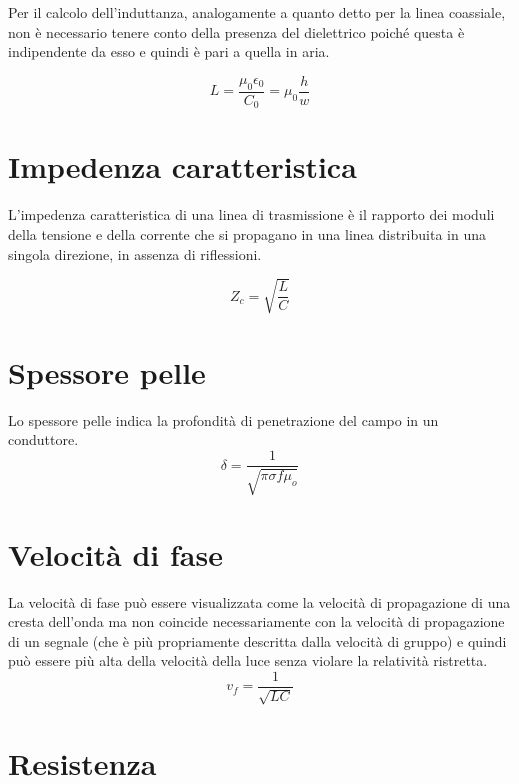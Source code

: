 \documentclass[10pt,a4paper]{report}
\begin{document}
			Per il calcolo dell’induttanza, analogamente a quanto detto per la linea coassiale, non è necessario tenere conto della presenza del dielettrico
			poiché questa è indipendente da esso e quindi è pari a quella in aria.
		
			\begin{equation}
				L=\frac{\mu_0 \epsilon_0}{C_0}=\mu_0 \frac{h}{w}
			\end{equation}
	


	\section{Impedenza caratteristica}

			L'impedenza caratteristica di una linea di trasmissione è il rapporto dei moduli della tensione e della corrente che si propagano in una linea distribuita in una singola direzione, in assenza di riflessioni.

			\begin{equation}
				Z_c=\sqrt{\frac{L}{C}}
			\end{equation}

	\section{Spessore pelle}
			Lo spessore pelle indica la profondità di penetrazione del campo in un conduttore.
			\begin{equation}
			\delta=\frac{1}{	\sqrt{\pi \sigma f \mu_o}}
			\end{equation}

	\section{Velocità di fase}
			 La velocità di fase può essere visualizzata come la velocità di propagazione di una cresta dell'onda ma non coincide necessariamente con la velocità di propagazione di un segnale (che è più propriamente descritta dalla velocità di gruppo) e quindi può essere più alta della velocità della luce senza violare la relatività ristretta.
			\begin{equation}
				v_f=\frac{1}{\sqrt{LC}}
			\end{equation}

	\section{Resistenza}
\end{document}

